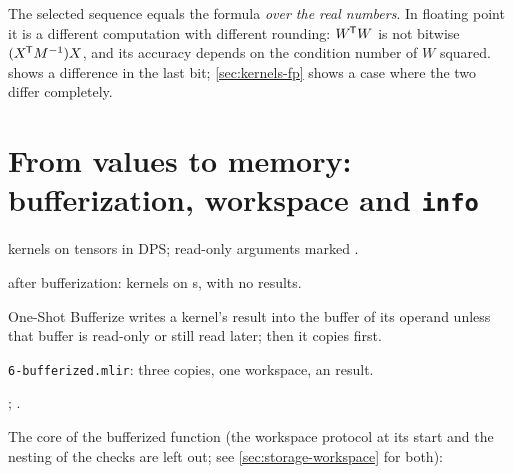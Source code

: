 \begin{limit}
The selected sequence equals the formula \emph{over the real numbers}. In
floating point it is a different computation with different rounding:
\(W^{\mkern-1.5mu\mathsf{T}} W\) is not bitwise \((X^{\mkern-1.5mu\mathsf{T}} M^{-1}) X\), and its accuracy depends on the
condition number of \(W\) squared.  shows a
difference in the last bit; \cref{sec:kernels-fp} shows a case where the
two differ completely.
\end{limit}

\section{From values to memory: bufferization, workspace and \texttt{info}}
\label{sec:gls-storage}

\begin{steps}
\item[Input] kernels on tensors in DPS; read-only arguments marked .
\item[Representation] after bufferization: kernels on s, with no results.
\item[Rule] One-Shot Bufferize writes a kernel's result into the buffer of its  operand unless that buffer is read-only or still read later; then it copies first.
\item[Output] \texttt{6-bufferized.mlir}: three copies, one workspace, an  result.
\item[Theory] ; .
\end{steps}

The core of the bufferized function (the workspace protocol at its start
and the  nesting of the  checks are left out; see
\cref{sec:storage-workspace} for both):

